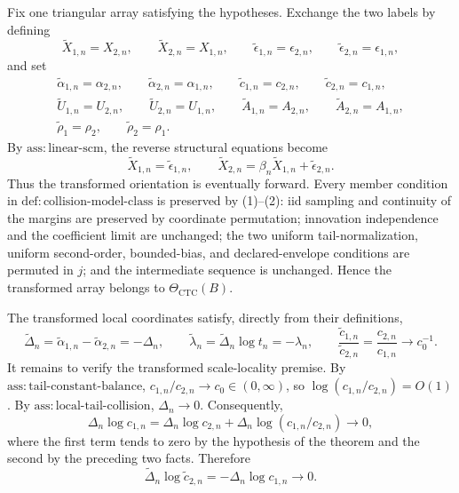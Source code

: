 Fix one triangular array satisfying the hypotheses. Exchange the two labels by defining
\[
\widetilde X_{1,n}=X_{2,n},\qquad
\widetilde X_{2,n}=X_{1,n},\qquad
\widetilde\epsilon_{1,n}=\epsilon_{2,n},\qquad
\widetilde\epsilon_{2,n}=\epsilon_{1,n},
\tag{1}
\]
and set
\[
\begin{gathered}
\widetilde\alpha_{1,n}=\alpha_{2,n},\qquad
\widetilde\alpha_{2,n}=\alpha_{1,n},\qquad
\widetilde c_{1,n}=c_{2,n},\qquad
\widetilde c_{2,n}=c_{1,n},\\
\widetilde U_{1,n}=U_{2,n},\qquad
\widetilde U_{2,n}=U_{1,n},\qquad
\widetilde A_{1,n}=A_{2,n},\qquad
\widetilde A_{2,n}=A_{1,n},\\
\widetilde\rho_1=\rho_2,\qquad
\widetilde\rho_2=\rho_1.
\end{gathered}
\tag{2}
\]
By \(\mathrm{ass{:}linear\text{-}scm}\), the reverse structural equations become
\[
\widetilde X_{1,n}=\widetilde\epsilon_{1,n},
\qquad
\widetilde X_{2,n}=\beta_n\widetilde X_{1,n}+\widetilde\epsilon_{2,n}.
\tag{3}
\]
Thus the transformed orientation is eventually forward. Every member condition in \(\mathrm{def{:}collision\text{-}model\text{-}class}\) is preserved by (1)--(2): iid sampling and continuity of the margins are preserved by coordinate permutation; innovation independence and the coefficient limit are unchanged; the two uniform tail-normalization, uniform second-order, bounded-bias, and declared-envelope conditions are permuted in \(j\); and the intermediate sequence is unchanged. Hence the transformed array belongs to \(\Theta_{\mathrm{CTC}}(B)\).

The transformed local coordinates satisfy, directly from their definitions,
\[
\widetilde\Delta_n
=\widetilde\alpha_{1,n}-\widetilde\alpha_{2,n}
=-\Delta_n,
\qquad
\widetilde\lambda_n
=\widetilde\Delta_n\log t_n
=-\lambda_n,
\qquad
\frac{\widetilde c_{1,n}}{\widetilde c_{2,n}}
=\frac{c_{2,n}}{c_{1,n}}\longrightarrow c_0^{-1}.
\tag{4}
\]
It remains to verify the transformed scale-locality premise. By \(\mathrm{ass{:}tail\text{-}constant\text{-}balance}\), \(c_{1,n}/c_{2,n}\to c_0\in(0,\infty)\), so \(\log(c_{1,n}/c_{2,n})=O(1)\). By \(\mathrm{ass{:}local\text{-}tail\text{-}collision}\), \(\Delta_n\to0\). Consequently,
\[
\Delta_n\log c_{1,n}
=\Delta_n\log c_{2,n}
+\Delta_n\log(c_{1,n}/c_{2,n})\longrightarrow0,
\tag{5}
\]
where the first term tends to zero by the hypothesis of the theorem and the second by the preceding two facts. Therefore
\[
\widetilde\Delta_n\log\widetilde c_{2,n}
=-\Delta_n\log c_{1,n}\longrightarrow0.
\tag{6}
\]

